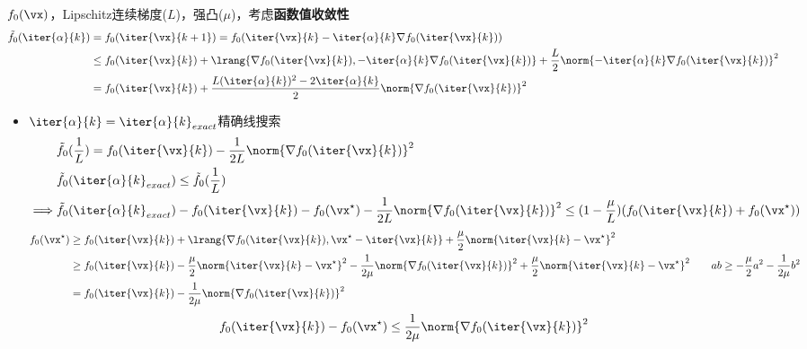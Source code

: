 \bigskip
$f_0(\vx)$，Lipschitz连续梯度($L$)，强凸($\mu$)，考虑\textbf{函数值收敛性}
\[\begin{aligned}
    \tilde{f}_0(\iter{\alpha}{k})&=f_0(\iter{\vx}{k+1})=f_0(\iter{\vx}{k}-\iter{\alpha}{k}\nabla f_0(\iter{\vx}{k}))\\
    &\leq f_0(\iter{\vx}{k})+\lrang{\nabla f_0(\iter{\vx}{k}),-\iter{\alpha}{k}\nabla f_0(\iter{\vx}{k})}+\frac{L}{2}\norm{-\iter{\alpha}{k}\nabla f_0(\iter{\vx}{k})}^2\\
    &=f_0(\iter{\vx}{k})+\frac{L(\iter{\alpha}{k})^2-2\iter{\alpha}{k}}{2}\norm{\nabla f_0(\iter{\vx}{k})}^2
\end{aligned}\]

\begin{itemize}
\item $\iter{\alpha}{k}=\iter{\alpha}{k}_{exact}$精确线搜索
\[\begin{aligned}
    &\tilde{f}_0(\frac{1}{L})=f_0(\iter{\vx}{k})-\frac{1}{2L}\norm{\nabla f_0(\iter{\vx}{k})}^2\\
    &\tilde{f}_0(\iter{\alpha}{k}_{exact})\leq\tilde{f}_0(\frac{1}{L})\\
    \implies&\tilde{f}_0(\iter{\alpha}{k}_{exact})-f_0(\iter{\vx}{k})-f_0(\vx^\star)-\frac{1}{2L}\norm{\nabla f_0(\iter{\vx}{k})}^2
    \leq (1-\frac{\mu}{L})(f_0(\iter{\vx}{k})+f_0(\vx^\star))
\end{aligned}\]
\[\begin{aligned}
    f_0(\vx^\star)&\geq f_0(\iter{\vx}{k})+\lrang{\nabla f_0(\iter{\vx}{k}),\vx^\star-\iter{\vx}{k}}+\frac{\mu}{2}\norm{\iter{\vx}{k}-\vx^\star}^2\\
    &\geq f_0(\iter{\vx}{k})-\frac{\mu}{2}\norm{\iter{\vx}{k}-\vx^\star}^2-\frac{1}{2\mu}\norm{\nabla f_0(\iter{\vx}{k})}^2+\frac{\mu}{2}\norm{\iter{\vx}{k}-\vx^\star}^2\qquad ab\geq-\frac{\mu}{2}a^2-\frac{1}{2\mu}b^2\\
    &= f_0(\iter{\vx}{k})-\frac{1}{2\mu}\norm{\nabla f_0(\iter{\vx}{k})}^2
\end{aligned}\]
\[f_0(\iter{\vx}{k})-f_0(\vx^\star)\leq\frac{1}{2\mu}\norm{\nabla f_0(\iter{\vx}{k})}^2\]


\end{itemize}
